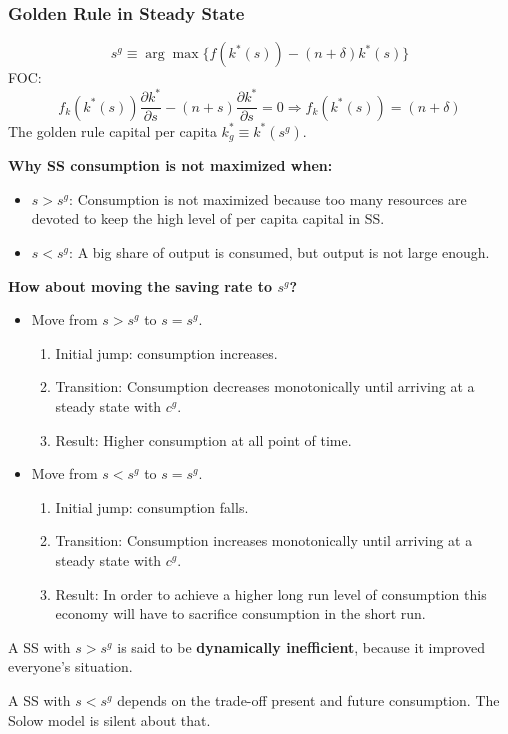 \subsubsection{Golden Rule in Steady State} \[
    s^g \equiv \arg \max\{f(k^*(s)) - (n+\delta)k^*(s)\}
\]
FOC: \[
    f_k(k^*(s))\frac{\partial k^*}{\partial s} - (n+s)\frac{\partial k^*}{\partial s} = 0 \Longrightarrow f_k(k^*(s)) = (n+\delta)
\]
The golden rule capital per capita $k^*_g \equiv k^*(s^g)$.

\textbf{Why SS consumption is not maximized when:} \begin{itemize}
    \item $s>s^g$: Consumption is not maximized because too many resources are devoted to keep the high level of per capita capital in SS.
    \item $s<s^g$: A big share of output is consumed, but output is not large enough.
\end{itemize}

\textbf{How about moving the saving rate to $s^g$?} \begin{itemize}
    \item Move from $s > s^g$ to $s = s^g$. \begin{enumerate}
              \item Initial jump: consumption increases.
              \item Transition: Consumption decreases monotonically until arriving at a steady state with $c^g$.
              \item Result: Higher consumption at all point of time.
          \end{enumerate}
    \item Move from $s < s^g$ to $s = s^g$. \begin{enumerate}
              \item Initial jump: consumption falls.
              \item Transition: Consumption increases monotonically until arriving at a steady state with $c^g$.
              \item Result: In order to achieve a higher long run level of consumption this economy will have to sacrifice consumption in the short run.
          \end{enumerate}
\end{itemize}

A SS with $s > s^g$ is said to be \textbf{dynamically inefficient}, because it improved everyone's situation.

A SS with $s < s^g$ depends on the trade-off present and future consumption. The Solow model is silent about that.



